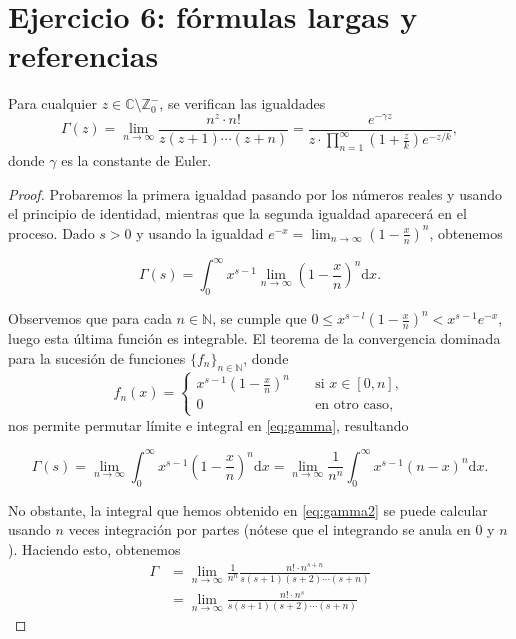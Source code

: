 \documentclass[a4paper,10pt]{article}
\theoremstyle{teorema}
\theoremstyle{plano}
\theoremstyle{titulo}
\begin{document}
\section{Ejercicio 6: fórmulas largas y referencias}

\noindent Para cualquier $z\in \mathbb{C}\setminus\mathbb{Z}_0^-$, se verifican las igualdades
\[\Gamma(z)=\lim_{n\rightarrow\infty}\frac{n^z\cdot n!}{z(z+1)\cdots(z+n)}=\frac{e^{-\gamma z}}{z\cdot\prod_{n=1}^\infty\left(1+\frac{z}{k}\right)e^{-z/k}},\]
donde $\gamma$ es la constante de Euler.


\begin{proof}
Probaremos la primera igualdad pasando por los números reales y usando el principio de identidad, mientras que la segunda igualdad aparecerá en el proceso. Dado $s>0$ y usando la igualdad $e^{-x}=\lim_{n\to\infty}\left(1-\frac{x}{n}\right)^n$, obtenemos

\begin{equation} \label{eq:gamma}
 \Gamma(s)=\int_0^\infty x^{s-1}\lim_{n\rightarrow\infty}\left(1-\frac{x}{n}\right)^n\mathrm{d} x.   
\end{equation}

Observemos que para cada $n\in\mathbb N$, se cumple que $0\leq x^{s-l}\left(1-\frac{x}{n}\right)^n<x^{s-1}e^{-x}$, luego esta última función es integrable. El teorema de la convergencia dominada para la sucesión de funciones $\{f_n\}_{n\in\mathbb{N}}$, donde
\[f_n(x)=\begin{cases}x^{s-1}\left(1-\frac{x}{n}\right)^n\quad &\text{si $x\in[0,n]$}, \\
0 &\text{en otro caso},\end{cases}\]
nos permite permutar límite e integral en \eqref{eq:gamma}, resultando

\begin{equation} \label{eq:gamma2}
    \Gamma(s)=\lim_{n\rightarrow\infty}\int_0^\infty x^{s-1}\left(1-\frac{x}{n}\right)^n\mathrm{d}x=\lim_{n\rightarrow\infty}\frac{1}{n^n}\int_0^\infty x^{s-1}\left(n-x\right)^n\mathrm{d} x.
\end{equation}

No obstante, la integral que hemos obtenido en \eqref{eq:gamma2} se puede calcular usando $n$ veces integración por partes (nótese que el integrando se anula en $0$ y $n$). Haciendo esto, obtenemos
\begin{equation} \label{eq:gamma-lim}
\begin{aligned}
\Gamma&=\lim_{n\to\infty}\frac{1}{n^n}\frac{n!\cdot n^{s+n}}{s(s+1)(s+2)\cdots(s+n)} \\
&=\lim_{n\to\infty}\frac{n!\cdot n^s}{s(s+1)(s+2)\cdots(s+n)}
\end{aligned}
\end{equation}



\end{proof}
\end{document}
